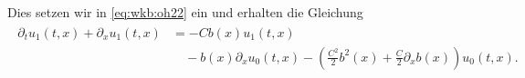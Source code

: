 Dies setzen wir in \eqref{eq:wkb:oh22} ein und erhalten die Gleichung
\begin{align}
\begin{split}\label{eq:wkb:oh222}
\partial_t u_1(t, x) + \partial_x u_1(t, x) &= - C b(x) u_1(t, x) \\
&\quad - b(x) \partial_x u_0(t, x) - \left( \frac{C^2}{2} b^2(x) + \frac{C}{2} \partial_x b(x) \right) u_0(t,x).
\end{split}
\end{align}
